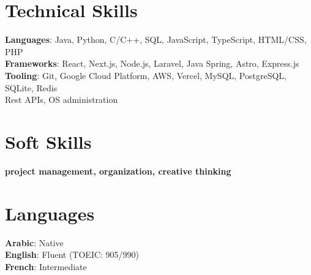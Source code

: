 \documentclass[letterpaper,11pt]{article}
\begin{document}
\section{Technical Skills}
 \begin{itemize}[leftmargin=0.15in, label={}]
    \small{\item{
     \textbf{Languages}{: Java, Python, C/C++, SQL, JavaScript, TypeScript, HTML/CSS, PHP} \\
     \textbf{Frameworks}{: React, Next.js, Node.js, Laravel, Java Spring, Astro, Express.js} \\
     \textbf{Tooling}{: Git, Google Cloud Platform, AWS, Vercel, MySQL, PostgreSQL, SQLite, Redis} \\
     \small{Rest APIs, OS administration}
    }}
 \end{itemize}

%

\section{Soft Skills}
 \begin{itemize}[leftmargin=0.15in, label={}]
    \small{\item{
     \textbf{project management, organization, creative thinking}
    }}
 \end{itemize}

%

\section{Languages}
 \begin{itemize}[leftmargin=0.15in, label={}]
    \small{\item{
     \textbf{Arabic}{: Native} \\
     \textbf{English}{: Fluent (TOEIC: 905/990)} \\
     \textbf{French}{: Intermediate} \\
    }}
 \end{itemize}
 
\end{document}
